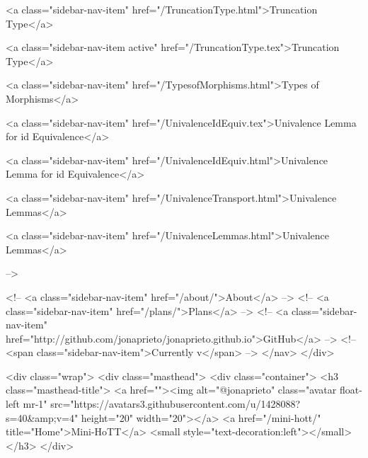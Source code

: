       
    
      
        
          <a class="sidebar-nav-item" href="/TruncationType.html">Truncation Type</a>
        
      
    
      
        
          <a class="sidebar-nav-item active" href="/TruncationType.tex">Truncation Type</a>
        
      
    
      
        
          <a class="sidebar-nav-item" href="/TypesofMorphisms.html">Types of Morphisms</a>
        
      
    
      
        
          <a class="sidebar-nav-item" href="/UnivalenceIdEquiv.tex">Univalence Lemma for id Equivalence</a>
        
      
    
      
        
          <a class="sidebar-nav-item" href="/UnivalenceIdEquiv.html">Univalence Lemma for id Equivalence</a>
        
      
    
      
        
          <a class="sidebar-nav-item" href="/UnivalenceTransport.html">Univalence Lemmas</a>
        
      
    
      
        
          <a class="sidebar-nav-item" href="/UnivalenceLemmas.html">Univalence Lemmas</a>
        
      
     -->

    <!-- <a class="sidebar-nav-item" href="/about/">About</a> -->
    <!-- <a class="sidebar-nav-item" href="/plans/">Plans</a> -->
    <!-- <a class="sidebar-nav-item" href="http://github.com/jonaprieto/jonaprieto.github.io">GitHub</a> -->
    <!-- <span class="sidebar-nav-item">Currently v</span> -->
  </nav>
</div>

    <div class="wrap">
      <div class="masthead">
        <div class="container">
          <h3 class="masthead-title">
            <a href=""><img alt="@jonaprieto" class="avatar float-left mr-1" src="https://avatars3.githubusercontent.com/u/1428088?s=40&amp;v=4" height="20" width="20"></a>
            <a href="/mini-hott/" title="Home">Mini-HoTT</a>
            <small style="text-decoration:left"></small>
          </h3>
        </div>
      
